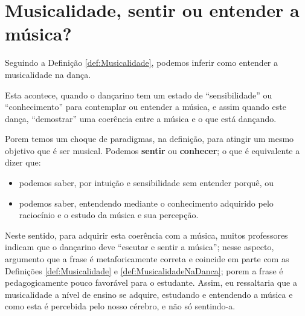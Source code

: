 
\section{Musicalidade, sentir ou entender a música?}
Seguindo a Definição \ref{def:Musicalidade}, podemos inferir como entender a musicalidade na dança.
\begin{definition} 
\label{def:MusicalidadeNaDanca}
Esta acontece, quando o dançarino tem um estado de ``sensibilidade'' ou ``conhecimento'' para contemplar ou entender a música,
e assim quando este dança, ``demostrar'' uma coerência entre a música e o que está dançando.
\end{definition}

Porem temos um choque de paradigmas, na definição, para atingir um mesmo objetivo que é ser musical.
Podemos \textbf{sentir} ou \textbf{conhecer}; o que é equivalente a dizer que:
\begin{itemize} 
\item podemos saber, por intuição e sensibilidade sem entender porquê, ou
\item podemos saber, entendendo mediante o conhecimento adquirido pelo raciocínio e o estudo da música e sua percepção.
\end{itemize}



Neste sentido, para adquirir esta coerência com a música, 
muitos professores indicam que o dançarino deve ``escutar e sentir a música'';
nesse aspecto, argumento que a frase é metaforicamente correta e coincide em parte com 
as Definições \ref{def:Musicalidade} e \ref{def:MusicalidadeNaDanca};
porem a frase  é pedagogicamente pouco favorável para o estudante.
Assim, eu ressaltaria que a musicalidade a nível de ensino se adquire,
estudando e entendendo a música e como esta é percebida pelo nosso cérebro, e não só sentindo-a.
 
